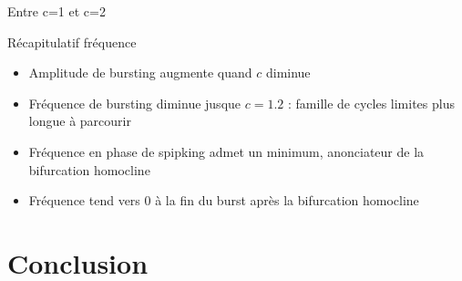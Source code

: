 \documentclass[xcolor={dvipsnames},10pt]{beamer}
\begin{document}
\begin{frame}{Entre c=1 et c=2}
\begin{center}

\end{center}
\end{frame}

\begin{frame}{Récapitulatif fréquence}
\begin{center}
\begin{itemize}
\item Amplitude de bursting augmente quand $c$ diminue
\item<2,3,4> Fréquence de bursting diminue jusque $c=1.2$ : famille de cycles limites plus longue à parcourir
\item<3,4> Fréquence en phase de spipking admet un minimum, anonciateur de la bifurcation homocline
\item<4> Fréquence tend vers $0$ à la fin du burst après la bifurcation homocline
\end{itemize}
\end{center}
\end{frame}


\section*{Conclusion}
\end{document}
